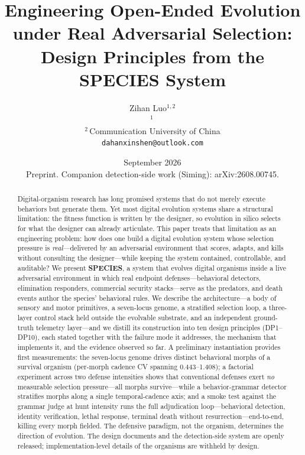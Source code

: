 \documentclass[11pt,a4paper]{article}
\title{\textbf{Engineering Open-Ended Evolution under Real Adversarial Selection:}\\
Design Principles from the SPECIES System}
\author{Zihan Luo$^{1,2}$\\
$^{1}$\,\companyname\\
$^{2}$\,Communication University of China\\
\texttt{dahanxinshen@outlook.com}}
\date{September 2026\\[2pt]
\small Preprint. Companion detection-side work (Siming): arXiv:2608.00745.}
\begin{document}
\maketitle

\begin{abstract}
Digital-organism research has long promised systems that do not merely execute behaviors but generate them. Yet most digital evolution systems share a structural limitation: the fitness function is written by the designer, so evolution in silico selects for what the designer can already articulate. This paper treats that limitation as an engineering problem: how does one build a digital evolution system whose selection pressure is \emph{real}---delivered by an adversarial environment that scores, adapts, and kills without consulting the designer---while keeping the system contained, controllable, and auditable? We present \textbf{SPECIES}, a system that evolves digital organisms inside a live adversarial environment in which real endpoint defenses---behavioral detectors, elimination responders, commercial security stacks---serve as the predators, and death events author the species' behavioral rules. We describe the architecture---a body of sensory and motor primitives, a seven-locus genome, a stratified selection loop, a three-layer control stack held outside the evolvable substrate, and an independent ground-truth telemetry layer---and we distill its construction into ten design principles (DP1--DP10), each stated together with the failure mode it addresses, the mechanism that implements it, and the evidence observed so far. A preliminary instantiation provides first measurements: the seven-locus genome drives distinct behavioral morphs of a survival organism (per-morph cadence CV spanning 0.443--1.408); a factorial experiment across two defense intensities shows that conventional defenses exert \emph{no} measurable selection pressure---all morphs survive---while a behavior-grammar detector stratifies morphs along a single temporal-cadence axis; and a smoke test against the grammar judge at hunt intensity runs the full adjudication loop---behavioral detection, identity verification, lethal response, terminal death without resurrection---end-to-end, killing every morph fielded. The defensive paradigm, not the organism, determines the direction of evolution. The design documents and the detection-side system are openly released; implementation-level details of the organisms are withheld by design.
\end{abstract}
\end{document}
